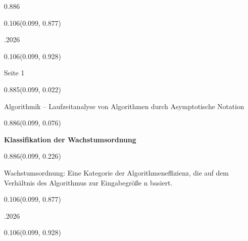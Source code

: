 \documentclass[aspectratio=169]{beamer}
\begin{document}
\begin{frame}[fragile]
\begin{textblock}{0.886}
\end{textblock}
\begin{textblock}{0.106}(0.099, 0.877)
  \begin{minipage}[b][0.026\paperheight]{\linewidth}
    \raggedright
    \fontsize{3}{3.3}.2026
  \end{minipage}
\end{textblock}
\begin{textblock}{0.106}(0.099, 0.928)
  \begin{minipage}[b][0.031\paperheight]{\linewidth}
    \raggedright
    \fontsize{3}{3.3}\selectfont Seite 1
  \end{minipage}
\end{textblock}
\end{frame}

\begin{frame}[fragile]
\begin{textblock}{0.885}(0.099, 0.022)
  \begin{minipage}[b][0.031\paperheight]{\linewidth}
    \fontsize{3}{3.3}\selectfont
    \raggedright
    Algorithmik – Laufzeitanalyse von Algorithmen durch Asymptotische Notation
  \end{minipage}
\end{textblock}
\begin{textblock}{0.886}(0.099, 0.076)
  \begin{minipage}[t][0.131\paperheight]{\linewidth}
    \textbf{Klassifikation der Wachstumsordnung}
  \end{minipage}
\end{textblock}
\begin{textblock}{0.886}(0.099, 0.226)
  \begin{minipage}[t][0.63\paperheight]{\linewidth}
    {\small
    Wachstumsordnung: Eine Kategorie der Algorithmeneffizienz, die auf dem Verhältnis des Algorithmus zur Eingabegröße n basiert.
    }
  \end{minipage}
\end{textblock}
\begin{textblock}{0.106}(0.099, 0.877)
  \begin{minipage}[b][0.026\paperheight]{\linewidth}
    \raggedright
    \fontsize{3}{3.3}.2026
  \end{minipage}
\end{textblock}
\begin{textblock}{0.106}(0.099, 0.928)
  \begin{minipage}[b][0.031\paperheight]{\linewidth}

\end{minipage}
\end{textblock}
\end{frame}
\end{document}
